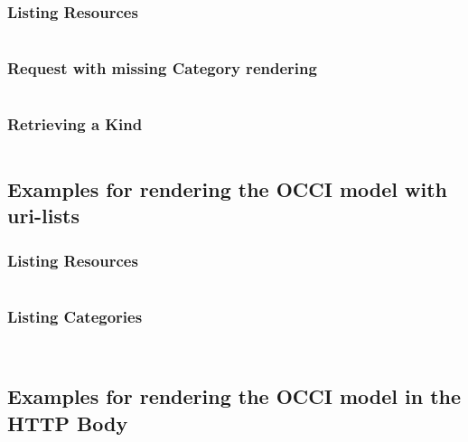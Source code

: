 \documentclass[10pt,a4paper]{article}
\begin{document}
\subsubsection{Listing Resources}

\begin{verbatim}

\end{verbatim}

\subsubsection{Request with missing Category rendering}

\begin{verbatim}

\end{verbatim}

\subsubsection{Retrieving a Kind}

\begin{verbatim}

\end{verbatim}

\subsection{Examples for rendering the OCCI model with uri-lists}

\subsubsection{Listing Resources}

\begin{verbatim}

\end{verbatim}

\subsubsection{Listing Categories}

\begin{verbatim}
 
\end{verbatim}

\subsection{Examples for rendering the OCCI model in the HTTP Body}
\end{document}
